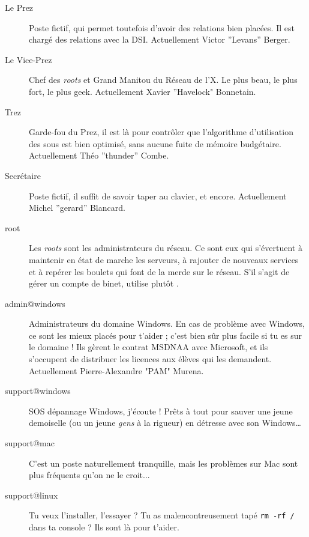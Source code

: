 \begin{description}

  \item[Le Prez]{Poste fictif, qui permet toutefois d'avoir des relations bien plac\'ees. Il est charg\'e des relations avec la DSI. Actuellement Victor ''Levans'' Berger.}
  
  \item[Le Vice-Prez]{Chef des \emph{roots} et Grand Manitou du R\'eseau de l'X. Le plus beau, le plus fort, le plus geek. Actuellement Xavier ''Havelock" Bonnetain.}

  \item[Trez]{Garde-fou du Prez, il est l\`a pour contr\^oler que l'algorithme d'utilisation des sous est bien optimis\'e, sans aucune fuite de m\'emoire budg\'etaire. Actuellement Th\'eo ''thunder'' Combe.}

  \item[Secr\'etaire]{Poste fictif, il suffit de savoir taper au clavier, et encore. Actuellement Michel ''gerard'' Blancard.}

  \item[root]{Les \emph{roots} sont les administrateurs du r\'eseau. Ce sont eux qui s'\'evertuent \`a maintenir en \'etat de marche les serveurs, \`a rajouter de 
  nouveaux services et \`a rep\'erer les boulets qui font de la merde sur le r\'eseau. S'il s'agit de g\'erer un compte de binet, utilise plut\^ot .}

  \item[admin@windows] {Administrateurs du domaine Windows. En cas de probl\`eme avec Windows, ce sont les mieux plac\'es pour t'aider ;
  c'est bien s\^ur  plus facile si tu es sur le domaine ! Ils g\`erent le contrat
  MSDNAA avec Microsoft, et ils s'occupent de distribuer les licences aux \'el\`eves qui les demandent. Actuellement Pierre-Alexandre "PAM" Murena.}
  
  \item[support@windows] {SOS d\'epannage Windows, j'\'ecoute ! Pr\^ets \`a tout pour sauver une jeune demoiselle (ou un jeune \emph{gens} \`a la rigueur) en d\'etresse avec son Windows\dots }

  \item[support@mac] {C'est un poste naturellement tranquille, mais les probl\`emes sur Mac sont plus fr\'equents qu'on ne le croit... }
  
  \item[support@linux] {Tu veux l'installer, l'essayer ? Tu as malencontreusement tap\'e \texttt{rm -rf /} dans ta console ? Ils sont l\`a pour t'aider.}
  

\end{description}
